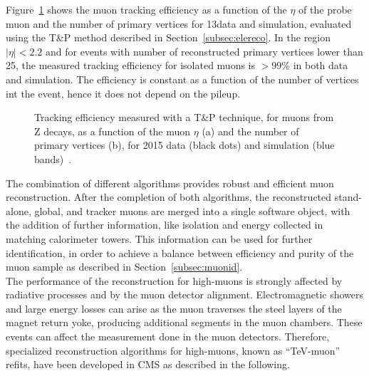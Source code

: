 Figure~\ref{fig:mu_reco_eff} shows the muon tracking efficiency as a function of the $\eta$ of the probe muon and the number of primary vertices for 13\TeV data and simulation, evaluated using the T\&P method described in Section~\ref{subsec:elereco}. In the region $|\eta| < 2.2$ and for events with number of reconstructed primary vertices lower than 25, the measured tracking efficiency for isolated muons is $> 99\%$ in both data and simulation. The efficiency is constant as a function of the number of vertices int the event, hence it does not depend on the pileup.\\

\begin{figure}[!htb]
\centering
{}
\caption{Tracking efficiency measured with a T\&P technique, for muons from Z decays, as a function of the muon $\eta$ (a) and the number of primary vertices (b), for 2015 data (black dots) and simulation (blue bands)~\cite{CMS-DP-2015-016}.}
\label{fig:mu_reco_eff}
\end{figure}

The combination of different algorithms provides robust and efficient muon reconstruction.
After the completion of both algorithms, the reconstructed stand-alone, global, and tracker muons are merged into a single software object, with the addition of further information, like isolation and energy collected in matching calorimeter towers. This information can be used for further identification, in order to achieve a balance between efficiency and purity of the muon sample as described in Section~\ref{subsec:muonid}.\\

The performance of the reconstruction for high-\pt muons is strongly affected by radiative processes and by the muon detector alignment. 
Electromagnetic showers and large energy losses can arise as the muon traverses the steel layers of the magnet return yoke, producing additional segments in the muon chambers.
These events can affect the measurement done in the muon detectors. Therefore, specialized reconstruction algorithms for high-\pt muons, known as ``TeV-muon'' refits, have been developed in CMS as described in the following.

